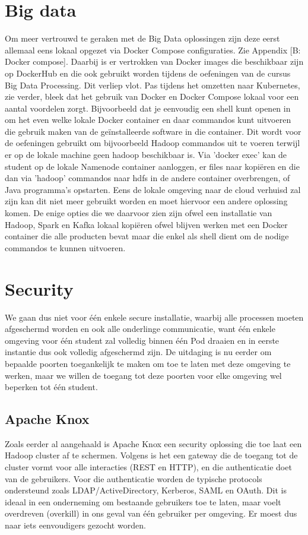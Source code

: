 \section{Big data}
Om meer vertrouwd te geraken met de Big Data oplossingen zijn deze eerst allemaal eens lokaal opgezet via Docker Compose configuraties. Zie Appendix [B: Docker compose].
Daarbij is er vertrokken van Docker images die beschikbaar zijn op DockerHub en die ook gebruikt worden tijdens de oefeningen van de cursus Big Data Processing.
\newline
\newline
Dit verliep vlot. Pas tijdens het omzetten naar Kubernetes, zie verder, bleek dat het gebruik van Docker en Docker Compose lokaal voor een aantal voordelen zorgt. Bijvoorbeeld dat je eenvoudig een shell kunt openen in om het even welke lokale Docker container en daar commandos kunt uitvoeren die gebruik maken van de geïnstalleerde software in die container. Dit wordt voor de oefeningen gebruikt om bijvoorbeeld Hadoop commandos uit te voeren terwijl er op de lokale machine geen hadoop beschikbaar is. Via 'docker exec' kan de student op de lokale Namenode container aanloggen, er files naar kopiëren en die dan via 'hadoop' commandos naar hdfs in de andere container overbrengen, of Java programma's opstarten.
Eens de lokale omgeving naar de cloud verhuisd zal zijn kan dit niet meer gebruikt worden en moet hiervoor een andere oplossing komen. De enige opties die we daarvoor zien zijn ofwel een installatie van Hadoop, Spark en Kafka lokaal kopiëren ofwel blijven werken met een Docker container die alle producten bevat maar die enkel als shell dient om de nodige commandos te kunnen uitvoeren.
\newline

\section{Security}
We gaan dus niet voor \'e\'en enkele secure installatie, waarbij alle processen moeten afgeschermd worden en ook alle onderlinge communicatie, want \'e\'en enkele omgeving voor \'e\'en student zal volledig binnen \'e\'en Pod draaien en in eerste instantie dus ook volledig afgeschermd zijn.
De uitdaging is nu eerder om bepaalde poorten toegankelijk te maken om toe te laten met deze omgeving te werken, maar we willen de toegang tot deze poorten voor elke omgeving wel beperken tot \'e\'en student.

\subsection{Apache Knox}
Zoals eerder al aangehaald is Apache Knox een security oplossing die toe laat een Hadoop cluster af te schermen.
Volgens \textcite{Knox2023} is het een gateway die de toegang tot de cluster vormt voor alle interacties (REST en HTTP), en die authenticatie doet van de gebruikers. Voor die authenticatie worden de typische protocols ondersteund zoals LDAP/ActiveDirectory, Kerberos, SAML en OAuth. Dit is ideaal in een onderneming om bestaande gebruikers toe te laten, maar voelt overdreven (overkill) in ons geval van \'e\'en gebruiker per omgeving. Er moest dus naar iets eenvoudigers gezocht worden.

